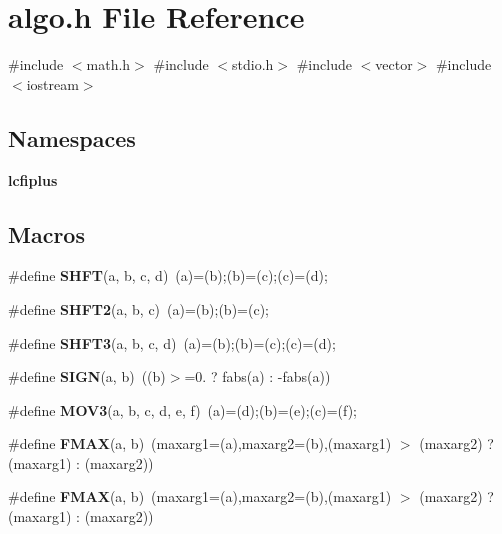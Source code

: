 \section{algo.\+h File Reference}
\label{algo_8h}
{\ttfamily \#include $<$math.\+h$>$}\newline
{\ttfamily \#include $<$stdio.\+h$>$}\newline
{\ttfamily \#include $<$vector$>$}\newline
{\ttfamily \#include $<$iostream$>$}\newline
\subsection*{Namespaces}
\begin{DoxyCompactItemize}
\item 
 \textbf{ lcfiplus}
\end{DoxyCompactItemize}
\subsection*{Macros}
\begin{DoxyCompactItemize}
\item 
\#define \textbf{ S\+H\+FT}(a,  b,  c,  d)~(a)=(b);(b)=(c);(c)=(d);
\item 
\#define \textbf{ S\+H\+F\+T2}(a,  b,  c)~(a)=(b);(b)=(c);
\item 
\#define \textbf{ S\+H\+F\+T3}(a,  b,  c,  d)~(a)=(b);(b)=(c);(c)=(d);
\item 
\#define \textbf{ S\+I\+GN}(a,  b)~((b)$>$=0. ? fabs(a) \+: -\/fabs(a))
\item 
\#define \textbf{ M\+O\+V3}(a,  b,  c,  d,  e,  f)~(a)=(d);(b)=(e);(c)=(f);
\item 
\#define \textbf{ F\+M\+AX}(a,  b)~(maxarg1=(a),maxarg2=(b),(maxarg1) $>$ (maxarg2) ? (maxarg1) \+: (maxarg2))
\item 
\#define \textbf{ F\+M\+AX}(a,  b)~(maxarg1=(a),maxarg2=(b),(maxarg1) $>$ (maxarg2) ? (maxarg1) \+: (maxarg2))
\end{DoxyCompactItemize}
